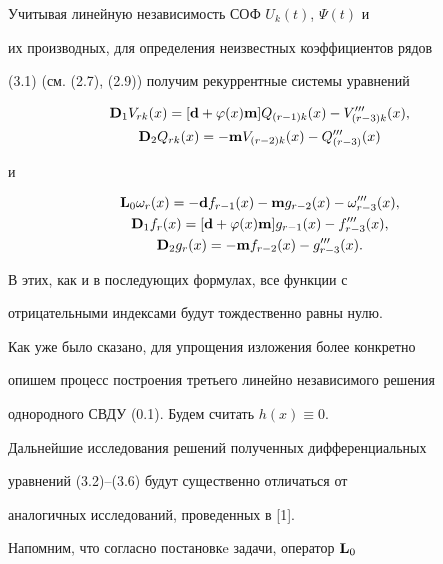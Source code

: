 Учитывая линейную независимость СОФ $U_k (t)$, $\Psi (t)$ и


их производных, для определения неизвестных коэффициентов рядов


(3.1) (см. (2.7), (2.9)) получим рекуррентные системы уравнений


\begin{gather}


\bold{D}_1 V_{rk} (x) = [ \bold{d} + \f (x) \bold{m}]


Q_{(r-1)k} (x) - V_{(r-3)k} ''' (x), \\


\bold{D}_2 Q_{rk} (x) = - \bold{m}V_{(r-2)k} (x) - Q_{(r-3)} ''' (x)


\end{gather}


и


\begin{gather}


\bold{L}_0 \omega_r (x) = - \bold{d}f_{r-1} (x) -


\bold{m}g_{r-2} (x) - \omega_{r-3}  '''(x), \\


\bold{D}_1 f_{r} (x) = [ \bold{d} + \f (x) \bold{m}] g_{r-1}


(x) - f_{r-3} ''' (x), \\


\bold{D}_2 g_{r} (x) = - \bold{m}f_{r-2} (x) - g_{r-3} ''' (x).


\end{gather}


В этих, как и в последующих формулах, все функции с


отрицательными индексами будут тождественно равны нулю.





Как уже было сказано, для упрощения изложения более конкретно


опишем процесс построения третьего линейно независимого решения


однородного СВДУ (0.1). Будем считать $h (x)\equiv 0$.


Дальнейшие исследования решений полученных дифференциальных


уравнений (3.2)--(3.6) будут существенно отличаться от


аналогичных исследований, проведенных в [1].





Напомним, что согласно постановкe задачи, оператор $\bold{L}_0$


